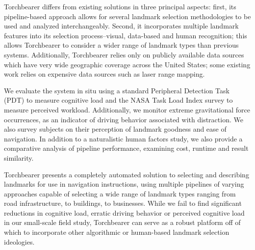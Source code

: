 Torchbearer differs from existing solutions in three principal aspects: first, its pipeline-based approach allows for several landmark selection methodologies to be used and analyzed interchangeably. Second, it incorporates multiple landmark features into its selection process--visual, data-based and human recognition; this allows Torchbearer to consider a wider range of landmark types than previous systems. Additionally, Torchbearer relies only on publicly available data sources which have very wide geographic coverage across the United States; some existing work relies on expensive data sources such as laser range mapping.

We evaluate the system in situ using a standard Peripheral Detection Task (PDT) to measure cognitive load and the NASA Task Load Index survey to measure perceived workload. Additionally, we monitor extreme gravitational force occurrences, as an indicator of driving behavior associated with distraction. We also survey subjects on their perception of landmark goodness and ease of navigation. In addition to a naturalistic human factors study, we also provide a comparative analysis of pipeline performance, examining cost, runtime and result similarity. 

Torchbearer presents a completely automated solution to selecting and describing landmarks for use in navigation instructions, using multiple pipelines of varying approaches capable of selecting a wide range of landmark types ranging from road infrastructure, to buildings, to businesses. While we fail to find significant reductions in cognitive load, erratic driving behavior or perceived cognitive load in our small-scale field study, Torchbearer can serve as a robust platform off of which to incorporate other algorithmic or human-based landmark selection ideologies.